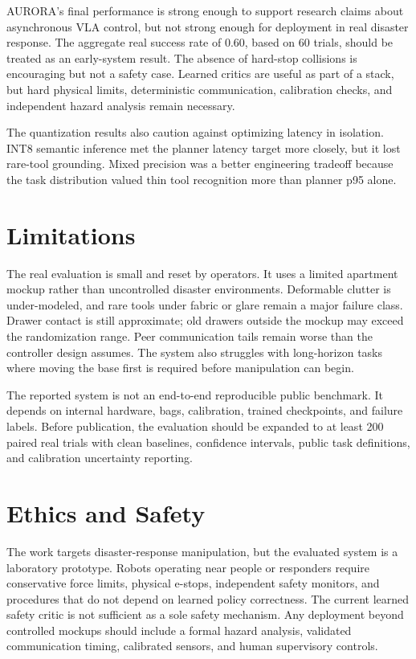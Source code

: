 \documentclass[10pt,twocolumn]{article}
\begin{document}
AURORA's final performance is strong enough to support research claims about asynchronous VLA control, but not strong enough for deployment in real disaster response. The aggregate real success rate of 0.60, based on 60 trials, should be treated as an early-system result. The absence of hard-stop collisions is encouraging but not a safety case. Learned critics are useful as part of a stack, but hard physical limits, deterministic communication, calibration checks, and independent hazard analysis remain necessary.

The quantization results also caution against optimizing latency in isolation. INT8 semantic inference met the planner latency target more closely, but it lost rare-tool grounding. Mixed precision was a better engineering tradeoff because the task distribution valued thin tool recognition more than planner p95 alone.

\section{Limitations}

The real evaluation is small and reset by operators. It uses a limited apartment mockup rather than uncontrolled disaster environments. Deformable clutter is under-modeled, and rare tools under fabric or glare remain a major failure class. Drawer contact is still approximate; old drawers outside the mockup may exceed the randomization range. Peer communication tails remain worse than the controller design assumes. The system also struggles with long-horizon tasks where moving the base first is required before manipulation can begin.

The reported system is not an end-to-end reproducible public benchmark. It depends on internal hardware, bags, calibration, trained checkpoints, and failure labels. Before publication, the evaluation should be expanded to at least 200 paired real trials with clean baselines, confidence intervals, public task definitions, and calibration uncertainty reporting.

\section{Ethics and Safety}

The work targets disaster-response manipulation, but the evaluated system is a laboratory prototype. Robots operating near people or responders require conservative force limits, physical e-stops, independent safety monitors, and procedures that do not depend on learned policy correctness. The current learned safety critic is not sufficient as a sole safety mechanism. Any deployment beyond controlled mockups should include a formal hazard analysis, validated communication timing, calibrated sensors, and human supervisory controls.
\end{document}
